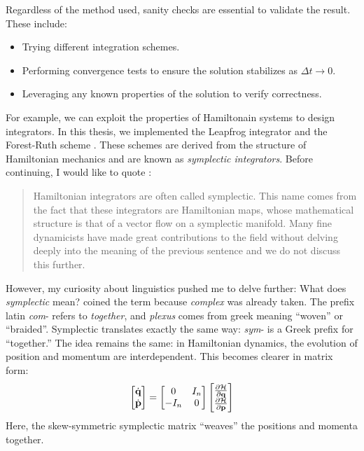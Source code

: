     Regardless of the method used, sanity checks are essential to validate the result. These include:
    \begin{itemize}
        \item Trying different integration schemes.
        \item Performing convergence tests to ensure the solution stabilizes as \( \Delta t \to 0 \).
        \item Leveraging any known properties of the solution to verify correctness.
    \end{itemize}
    For example, we can exploit the properties of Hamiltonain systems to design integrators. In this thesis, we implemented the Leapfrog integrator and the Forest-Ruth scheme \citep{bovy_inprep, 1990PhyD...43..105F}. These schemes are derived from the structure of Hamiltonian mechanics and are known as \textit{symplectic integrators}. Before continuing, I would like to quote \citep{bovy_inprep}:
    \begin{quote}
        Hamiltonian integrators are often called symplectic. This name comes from the fact that these integrators are Hamiltonian maps, whose mathematical structure is that of a vector flow on a symplectic manifold. Many fine dynamicists have made great contributions to the field without delving deeply into the meaning of the previous sentence and we do not discuss this further.
    \end{quote}
    However, my curiosity about linguistics pushed me to delve further: What does \textit{symplectic} mean? \citet{weyl1946classical} coined the term because \textit{complex} was already taken. The prefix latin \textit{com}- refers to \textit{together}, and \textit{plexus} comes from greek meaning ``woven'' or ``braided''. Symplectic translates exactly the same way: \textit{sym}- is a Greek prefix for ``together.'' The idea remains the same: in Hamiltonian dynamics, the evolution of position and momentum are interdependent. This becomes clearer in matrix form:
    \begin{equation}
        \begin{bmatrix}
            \dot{\bf{q}}\\
            \dot{\bf{p}}
        \end{bmatrix}
         = 
        \begin{bmatrix}
            0 & I_n \\
            -I_n & 0 
        \end{bmatrix}
                \begin{bmatrix}
            \frac{\partial \mathcal{H}}{\partial \bf{q}} \\
            \frac{\partial \mathcal{H}}{\partial \bf{p}}
        \end{bmatrix}
        \label{eq:symplectic}
    \end{equation}
    Here, the skew-symmetric symplectic matrix ``weaves'' the positions and momenta together.

